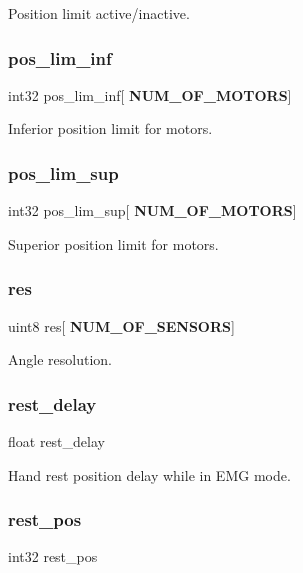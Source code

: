 Position limit active/inactive. \mbox{\label{structst__mem_a631265c712a620e03d9233634e1819a2}} 
\subsubsection{pos\+\_\+lim\+\_\+inf}
{\footnotesize\ttfamily int32 pos\+\_\+lim\+\_\+inf[\textbf{ N\+U\+M\+\_\+\+O\+F\+\_\+\+M\+O\+T\+O\+RS}]}

Inferior position limit for motors. \mbox{\label{structst__mem_a818808d7c324999701b5aad40a8fabca}} 
\subsubsection{pos\+\_\+lim\+\_\+sup}
{\footnotesize\ttfamily int32 pos\+\_\+lim\+\_\+sup[\textbf{ N\+U\+M\+\_\+\+O\+F\+\_\+\+M\+O\+T\+O\+RS}]}

Superior position limit for motors. \mbox{\label{structst__mem_ac2e19d167eac4c8ca9ce97c646e78595}} 
\subsubsection{res}
{\footnotesize\ttfamily uint8 res[\textbf{ N\+U\+M\+\_\+\+O\+F\+\_\+\+S\+E\+N\+S\+O\+RS}]}

Angle resolution. \mbox{\label{structst__mem_a5d9f92583ac10c78cbb3c0da7a373f6a}} 
\subsubsection{rest\+\_\+delay}
{\footnotesize\ttfamily float rest\+\_\+delay}

Hand rest position delay while in E\+MG mode. \mbox{\label{structst__mem_a27742da1d6ad36d8051848f9e4346146}} 
\subsubsection{rest\+\_\+pos}
{\footnotesize\ttfamily int32 rest\+\_\+pos}

